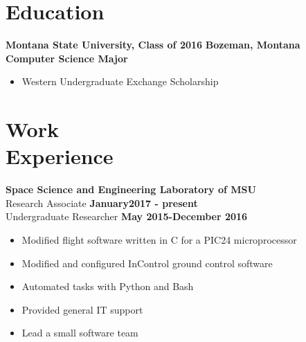 \documentclass[margin]{res}
\begin{document}
 
 
 
\address{{\bf Present Address} \\ 412 W. Hayes St. \\ Bozeman, MT 59715  \\ (801)-750-4528 \\ \texttt{nevinleh@gmail.com}
        }
\address{{\bf Permanent Address} \\ 3504 Macintosh Cir. \\ Cottonwood Heights, UT 84121 \\
        (801)-750-4528 }

 
\begin{resume} 
\noindent\makebox[\linewidth]{\rule{\paperwidth}{0.2pt}}
\section{Education} 
\textbf{Montana State University, Class of 2016} \hfill \textbf{Bozeman, Montana} \\ \textbf{Computer Science Major}
\begin{itemize} \itemsep -2pt
\item Western Undergraduate Exchange Scholarship

\end{itemize}


\noindent\makebox[\linewidth]{\rule{\paperwidth}{0.2pt}}
\section{Work \\ Experience}

{\bf  Space Science and Engineering Laboratory of MSU}  
\\Research Associate    \hfill \textbf{January2017 - present}   
\\Undergraduate Researcher             \hfill \textbf{May 2015-December 2016}   
\begin{itemize} \itemsep -2pt
	\item Modified flight software written in C for a PIC24 microprocessor
	\item Modified and configured InControl ground control software
	\item Automated tasks with Python and Bash
	\item Provided general IT support
	\item Lead a small software team
         

\end{itemize}
\end{resume}
\end{document}
